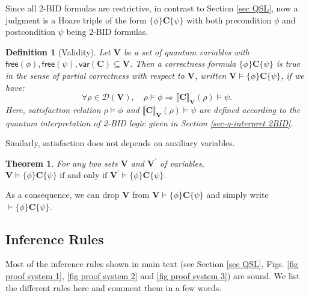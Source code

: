 \documentclass[conference,compsoc, 10pt]{IEEEtran}
\newtheorem{theorem}{Theorem}[section]
\newtheorem{definition}{Definition}[section]
\newcommand {\cD } {{\mathcal{D}}}
\newcommand {\vars } {\mathbf{V}}
\newcommand {\V }[1] {{\mathsf{free}{\left(#1\right)}}}
\newcommand {\var } {\mathsf{var}}
\newcommand {\prog } {{\mathbf{C}}}
\newcommand {\sem}[1] {\llbracket#1\rrbracket}
\begin{document}
\begin{appendices}
		Since all 2-BID formulas are restrictive, in contrast to Section \ref{sec QSL}, now a judgment is a Hoare triple of the form $\{\phi\}\prog\{\psi\}$ with both precondition $\phi$ and postcondition $\psi$ being 2-BID formulas.   
		
		\begin{definition}[Validity] Let $\vars$ be a set of quantum variables with $\V{\phi},\V{\psi},\var(\prog)\subseteq\vars$. Then a correctness formula $\{\phi\}\prog\{\psi\}$ is true in the sense of partial correctness with respect to $\vars$, written 
			$\vars \models\{\phi\}\prog\{\psi\}$, 
			if we have:
			$$\forall \rho\in\cD(\vars),\quad \rho\models\phi\Rightarrow\sem{\prog}_{\vars}(\rho)\models\psi.$$ Here, satisfaction relation $\rho\models\phi$ and $\sem{\prog}_{\vars}(\rho)\models\psi$ are defined according to the quantum interpretation of 2-BID logic given in Section \ref{sec-q-interpret 2BID}.
		\end{definition}
		
		Similarly, satisfaction does not depends on auxiliary variables.
		\begin{theorem}
			\label{thm eq glb var set 2BID}
			For any two sets $\vars$ and $\vars^\prime$ of variables,
			$\vars\models\{\phi\}\prog\{\psi\} \text{\ if\ and\ only\ if\ }\vars^\prime\models\{\phi\}\prog\{\psi\}.$
		\end{theorem}
		
		As a consequence, we can drop $\vars$ from $\vars\models\{\phi\}\prog\{\psi\}$ and simply write $\models\{\phi\}\prog\{\psi\}$. 
		
		
		\subsection{Inference Rules}
		
		Most of the inference rules shown in main text (see Section \ref{sec QSL}, Figs. \ref{fig proof system 1}, \ref{fig proof system 2} and \ref{fig proof system 3}) are sound. We list the different rules here and comment them in a few words.
		

\end{appendices}
\end{document}
